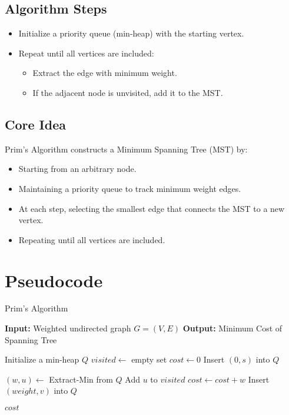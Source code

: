 \documentclass[14pt,a4paper]{extarticle}
\begin{document}
\subsection{Algorithm Steps}
\begin{itemize}
    \item Initialize a priority queue (min-heap) with the starting vertex.
    \item Repeat until all vertices are included:
    \begin{itemize}
        \item Extract the edge with minimum weight.
        \item If the adjacent node is unvisited, add it to the MST.
    \end{itemize}
\end{itemize}

\subsection{Core Idea}
Prim's Algorithm constructs a Minimum Spanning Tree (MST) by:
\begin{itemize}
    \item Starting from an arbitrary node.
    \item Maintaining a priority queue to track minimum weight edges.
    \item At each step, selecting the smallest edge that connects the MST to a new vertex.
    \item Repeating until all vertices are included.
\end{itemize}

\section*{Pseudocode}

\begin{algorithm}[H]
\caption{Prim's Algorithm}
\begin{algorithmic}[1]
\State \textbf{Input:} Weighted undirected graph $G = (V, E)$
\State \textbf{Output:} Minimum Cost of Spanning Tree

    \State Initialize a min-heap $Q$
    \State $visited \gets$ empty set
    \State $cost \gets 0$
    \State Insert $(0, s)$ into $Q$ 

        \State $(w, u) \gets$ Extract-Min from $Q$
            \State Add $u$ to $visited$
            \State $cost \gets cost + w$
                    \State Insert $(weight, v)$ into $Q$
                \EndIf
            \EndFor
        \EndIf
    \EndWhile

    \State \Return $cost$
\EndFunction
\end{algorithmic}
\end{algorithm}
\end{document}

